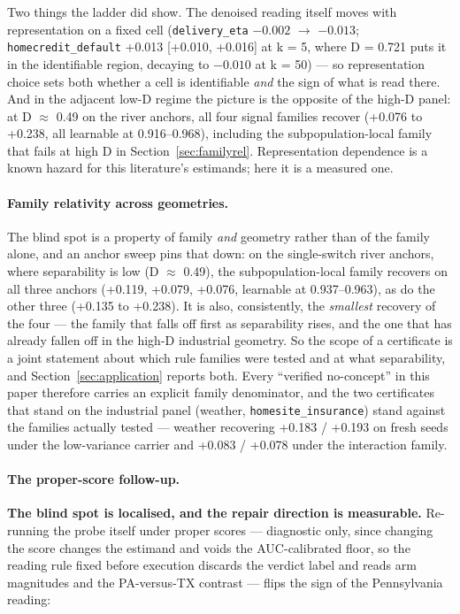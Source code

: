 \documentclass[10pt]{article} %
\begin{document}
Two things the ladder did show. The denoised reading itself moves with representation on a fixed
cell (\texttt{delivery\_eta} $-0.002$ $\to$ $-0.013$; \texttt{homecredit\_default} +0.013 [+0.010, +0.016] at k = 5, where
D = 0.721 puts it in the identifiable region, decaying to $-0.010$ at k = 50) --- so representation
choice sets both whether a cell is identifiable \emph{and} the sign of what is read there. And in the
adjacent low-D regime the picture is the opposite of the high-D panel: at D $\approx$ 0.49 on the river
anchors, all four signal families recover (+0.076 to +0.238, all learnable at 0.916--0.968),
including the subpopulation-local family that fails at high D in Section~\ref{sec:familyrel}. Representation dependence
is a known hazard for this literature's estimands; here it is a measured one.

\paragraph{Family relativity across geometries.}

The blind spot is a property of family \emph{and} geometry rather than of the family alone, and an
anchor sweep pins that down: on the single-switch river anchors, where separability is low
(D $\approx$ 0.49), the subpopulation-local family recovers on all three anchors (+0.119, +0.079, +0.076,
learnable at 0.937--0.963), as do the other three (+0.135 to +0.238). It is also, consistently, the
\emph{smallest} recovery of the four --- the family that falls off first as separability rises, and the
one that has already fallen off in the high-D industrial geometry. So the scope of a certificate is
a joint statement about which rule families were tested and at what separability, and Section~\ref{sec:application} reports
both. Every ``verified no-concept'' in this
paper therefore carries an explicit family denominator, and the two certificates that stand on the
industrial panel (weather, \texttt{homesite\_insurance}) stand against the families actually tested --- weather
recovering +0.183 / +0.193 on fresh seeds under the low-variance carrier and +0.083 / +0.078 under
the interaction family.

\paragraph{The proper-score follow-up.}

\textbf{The blind spot is localised, and the repair direction is measurable.} Re-running the probe
itself under proper scores --- diagnostic only, since changing the score changes the estimand and
voids the AUC-calibrated floor, so the reading rule fixed before execution discards the verdict
label and reads arm magnitudes and the PA-versus-TX contrast --- flips the sign of the Pennsylvania
reading:
\end{document}

